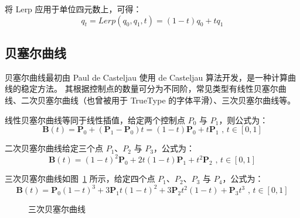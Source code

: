 将 Lerp 应用于单位四元数上，可得：
\begin{equation}
  q_t = Lerp(q_0, q_1, t) = (1-t)q_0 + tq_1
  \label{eq:quaternions-lerp}
\end{equation}

\subsection{贝塞尔曲线}

贝塞尔曲线最初由 Paul de Casteljau 使用 de Casteljau 算法开发，是一种计算曲线的稳定方法。
其根据控制点的数量可分为不同阶，常见类型有线性贝塞尔曲线、二次贝塞尔曲线（也曾被用于 TrueType 的字体平滑）、三次贝塞尔曲线等。

线性贝塞尔曲线等同于线性插值，给定两个控制点 $P_0$ 与 $P_1$，则公式为：
\begin{equation}
  {\mathbf  {B}}(t)={\mathbf  {P}}_{0}+({\mathbf  {P}}_{1}-{\mathbf  {P}}_{0})t=(1-t){\mathbf  {P}}_{0}+t{\mathbf  {P}}_{1}{\mbox{ , }}t\in [0,1]
\end{equation}

二次贝塞尔曲线给定三个点 $P_1$、$P_2$ 与 $P_3$，公式为：
\begin{equation}
  {\mathbf  {B}}(t)=(1-t)^{{2}}{\mathbf  {P}}_{0}+2t(1-t){\mathbf  {P}}_{1}+t^{{2}}{\mathbf  {P}}_{2}{\mbox{ , }}t\in [0,1]
\end{equation}

三次贝塞尔曲线如图~\ref{fig:bezier-curve-3rd} 所示，给定四个点 $P_1$、$P_2$、$P_3$ 与 $P_4$，公式为：
\begin{equation}
  {\mathbf  {B}}(t)={\mathbf  {P}}_{0}(1-t)^{3}+3{\mathbf  {P}}_{1}t(1-t)^{2}+3{\mathbf  {P}}_{2}t^{2}(1-t)+{\mathbf  {P}}_{3}t^{3}{\mbox{ , }}t\in [0,1]
\end{equation}

\begin{figure}[htb]
  \centering
  \caption{三次贝塞尔曲线}
  \label{fig:bezier-curve-3rd}
\end{figure}

